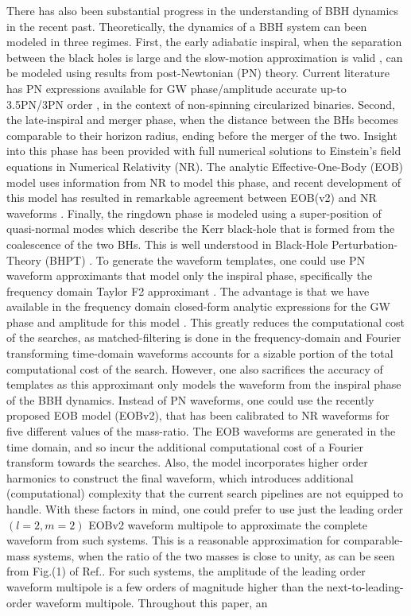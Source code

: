 \documentclass[aps,
prd,
amsmath,
amssymb,
twocolumn,
floatfix,
groupedaddress]{revtex4-1}
\begin{document}
There has also been substantial progress in the understanding of BBH dynamics in the recent past. Theoretically, the dynamics of a BBH system can been modeled in three regimes. First, the early adiabatic inspiral, when the separation between the black holes is large and the slow-motion approximation is valid \citep{PNtheoryLivingReviewBlanchet}, can be modeled using results from post-Newtonian (PN) theory. Current literature has PN expressions available for GW phase/amplitude accurate up-to 3.5PN/3PN order \citep{PNFluxEnergy3PN01,KidderPN,Blanchet3PN}, in the context of non-spinning circularized binaries. Second, the late-inspiral and merger phase, when the distance between the BHs becomes comparable to their horizon radius, ending before the merger of the two. Insight into this phase has been provided with full numerical solutions to Einstein's field equations in Numerical Relativity (NR). The analytic Effective-One-Body (EOB) model \citep{EOBOriginalBuonannoDamour} uses information from NR to model this phase, and recent development of this model \citep{EOBNR01,EOBNRdevel01,EOBNRdevel02,EOBNRdevel03,EOBNRdevel04,EOBdevel01,EOBdevel02} has resulted in remarkable agreement between EOB(v2) and NR waveforms \citep{BuonannoEOBv2Main}. Finally, the ringdown phase is modeled using a super-position of quasi-normal modes which describe the Kerr black-hole that is formed from the coalescence of the two BHs. This is well understood in Black-Hole Perturbation-Theory (BHPT) \citep{BHRDQNMs,BHPTMinoSasaki}. To generate the waveform templates, one could use PN waveform approximants that model only the inspiral phase, specifically the frequency domain Taylor F2 approximant \citep{JolienGWPhysAst}. The advantage is that we have available in the frequency domain closed-form analytic expressions for the GW phase and amplitude for this model \citep{JolienGWPhysAst}. This greatly reduces the computational cost of the searches, as matched-filtering is done in the frequency-domain and Fourier transforming time-domain waveforms accounts for a sizable portion of the total computational cost of the search. However, one also sacrifices the accuracy of templates as this approximant only models the waveform from the inspiral phase of the BBH dynamics. Instead of PN waveforms, one could use the recently proposed EOB model \citep{BuonannoEOBv2Main} (EOBv2), that has been calibrated to NR waveforms for five different values of the mass-ratio. The EOB waveforms are generated in the time domain, and so incur the additional computational cost of a Fourier transform towards the searches. Also, the model incorporates higher order harmonics to construct the final waveform, which introduces additional (computational) complexity that the current search pipelines are not equipped to handle. With these factors in mind, one could prefer to use just the leading order $(l=2,m=2)$ EOBv2 waveform multipole to approximate the complete waveform from such systems. This is a reasonable approximation for comparable-mass systems, when the ratio of the two masses is close to unity, as can be seen from Fig.(1) of Ref.\citep{BuonannoEOBv2Main}. For such systems, the amplitude of the leading order waveform multipole is a few orders of magnitude higher than the next-to-leading-order waveform multipole. Throughout this paper, an 
\end{document}
